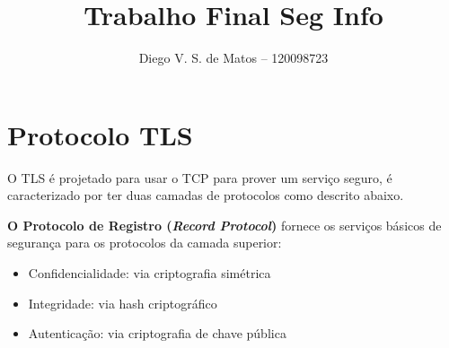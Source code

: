 \documentclass[]{article}
\title{Trabalho Final Seg Info}
\author{Diego V. S. de Matos -- 120098723}
\begin{document}
\maketitle

\section{Protocolo TLS}
O TLS é projetado para usar o TCP para prover um serviço seguro, é caracterizado por ter duas camadas de protocolos como descrito abaixo.

\textbf{O Protocolo de Registro (\textit{Record Protocol})} fornece os serviços básicos de segurança para os protocolos da camada superior:
\begin{itemize}
	\item Confidencialidade: via criptografia simétrica
	\item Integridade: via hash criptográfico
	\item Autenticação: via criptografia de chave pública
\end{itemize}
\end{document}
